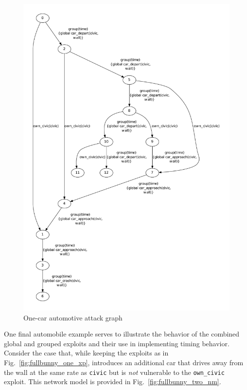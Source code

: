 \begin{figure}
\centering
\includegraphics[height=0.9\textheight]{ag_car/onecar/full_bunny_onecar_ag_5}
\caption{One-car automotive attack graph}
\label{fig:fullbunny_one_ag}
\end{figure}

One final automobile example serves to illustrate the behavior of the
combined global and grouped exploits and their use in implementing
timing behavior. Consider the case that, while keeping the exploits
as in Fig.~\ref{fig:fullbunny_one_xp}, introduces an additional car
that drives away from the wall
at the same rate as \texttt{civic} but is \emph{not} vulnerable to the 
\texttt{own\_civic} exploit. This network model is provided in 
Fig.~\ref{fig:fullbunny_two_nm}.

